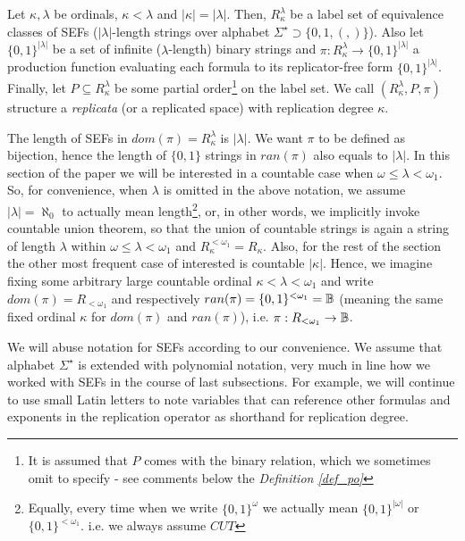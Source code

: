 \begin{definition}[Replicata]\label{def_replicata}
  Let $\kappa, \lambda$ be ordinals, $\kappa < \lambda$ and $|\kappa| = |\lambda|$. Then, $R^\lambda_\kappa$ be a label set of equivalence classes of SEFs ($|\lambda|$-length strings over alphabet $\Sigma^\star \supset \{0,1,(,)\}$). Also let $\{0,1\}^{|\lambda|}$ be a set of infinite ($\lambda$-length) binary strings and $\pi: R^\lambda_\kappa \to \{0,1\}^{|\lambda|}$ a production function evaluating each formula to its replicator-free form $\{0,1\}^{|\lambda|}$. Finally, let $P \subseteq R^\lambda_\kappa$ be some partial order\footnote{It is assumed that $P$ comes with the binary relation, which we sometimes omit to specify - see comments below the \textit{Definition \ref{def_po}}} on the label set. We call $(R^\lambda_\kappa, P, \pi)$ structure a \textit{replicata} (or a replicated space) with replication degree $\kappa$.
\end{definition}

The length of SEFs in $dom(\pi) = R^\lambda_\kappa$ is $|\lambda|$. We want $\pi$ to be defined as bijection, hence the length of $\{0,1\}$ strings in $ran(\pi)$ also equals to $|\lambda|$. In this section of the paper we will be interested in a countable case when $\omega \leq \lambda < \omega_1$. So, for convenience, when $\lambda$ is omitted in the above notation, we assume $|\lambda| = \aleph_0$ to actually mean length\footnote{Equally, every time when we write $\{0,1\}^{\omega}$ we actually mean $\{0,1\}^{|\omega|}$ or $\{0,1\}^{<\omega_1}$. i.e. we always assume $CUT$}, or, in other words, we implicitly invoke countable union theorem, so that the union of countable strings is again a string of length $\lambda$ within $\omega \leq \lambda < \omega_1$ and $R^{<\omega_1}_\kappa = R_\kappa$. Also, for the rest of the section the other most frequent case of interested is countable $|\kappa|$. Hence, we imagine fixing some arbitrary large countable ordinal $\kappa < \lambda < \omega_1$ and write $dom(\pi) = R_{<\omega_1}$ and respectively $ran(\pi) = \{0,1\}^{<\omega_1} = \mathbb{B}$ (meaning the same fixed ordinal $\kappa$ for $dom(\pi)$ and $ran(\pi)$), i.e. $\pi: R_{<\omega_1} \to \mathbb{B}$. 

We will abuse notation for SEFs according to our convenience. We assume that alphabet $\Sigma^\star$ is extended with polynomial notation, very much in line how we worked with SEFs in the course of last subsections. For example, we will continue to use small Latin letters to note variables that can reference other formulas and exponents in the replication operator as shorthand for replication degree. 

